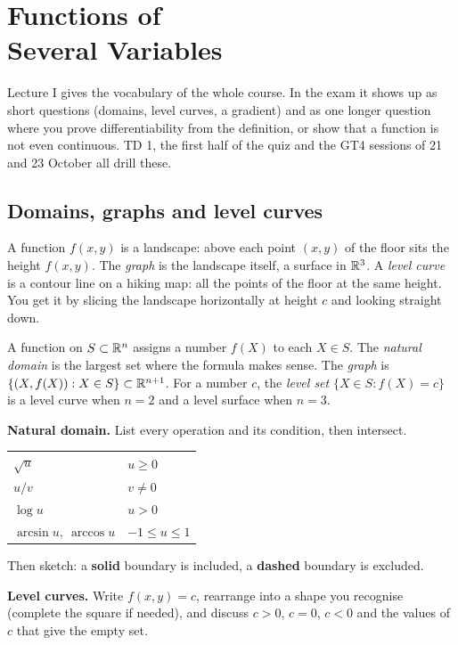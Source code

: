 \chapter[Functions of Several Variables]{Functions of\\ Several Variables}\label{ch:one}

\begin{examnote}
Lecture I gives the vocabulary of the whole course. In the exam it shows up as short
questions (domains, level curves, a gradient) and as one longer question where you prove
differentiability from the definition, or show that a function is not even continuous.
TD 1, the first half of the quiz and the GT4 sessions of 21 and 23 October all drill these.
\end{examnote}

\section{Domains, graphs and level curves}

\begin{intuition}
A function $f(x,y)$ is a landscape: above each point $(x,y)$ of the floor sits the height
$f(x,y)$. The \emph{graph} is the landscape itself, a surface in $\mathbb{R}^3$. A \emph{level
curve} is a contour line on a hiking map: all the points of the floor at the same height.
You get it by slicing the landscape horizontally at height $c$ and looking straight down.
\end{intuition}

\begin{defi}
A function on $S\subset\mathbb{R}^n$ assigns a number $f(X)$ to each $X\in S$. The \emph{natural
domain} is the largest set where the formula makes sense. The \emph{graph} is
$\{(X,f(X)) : X\in S\}\subset\mathbb{R}^{n+1}$. For a number $c$, the \emph{level set}
$\{X\in S : f(X)=c\}$ is a level curve when $n=2$ and a level surface when $n=3$.
\end{defi}

\begin{method}
\textbf{Natural domain.} List every operation and its condition, then intersect.
\begin{center}
\begin{tabular}{@{}ll@{}}
$\sqrt{u}$ & $u\ge 0$\\
$u/v$ & $v\neq 0$\\
$\log u$ & $u>0$\\
$\arcsin u,\ \arccos u$ & $-1\le u\le 1$
\end{tabular}
\end{center}
Then sketch: a \textbf{solid} boundary is included, a \textbf{dashed} boundary is excluded.

\textbf{Level curves.} Write $f(x,y)=c$, rearrange into a shape you recognise (complete
the square if needed), and discuss $c>0$, $c=0$, $c<0$ and the values of $c$ that give the
empty set.
\end{method}

